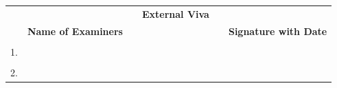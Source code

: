 \fi %
\ifStuNameCUsed \vspace{-0.75cm}\fi
\begin{table}[H]
\centering
\begin{tabular}{lccp{5cm}cc}
	&&&\textbf{\Large External Viva}&&\\
	
	& \textbf{Name of Examiners} &&& & \textbf{Signature with Date}\\
	&&&&&\\
	1.&&&&&\\
	&&&&&\\
	2.&&&&&\\
\end{tabular}%
\end{table}
